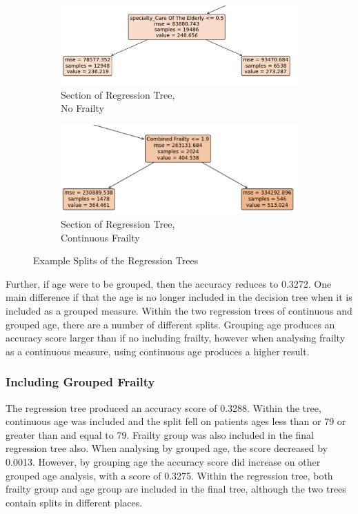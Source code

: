 \documentclass[../thesis.tex]{subfiles}
\begin{document}
\begin{figure}[h!]
\centering
\begin{subfigure}{.49\textwidth}
  \centering
  \captionsetup{justification=centering}
  \includegraphics[width=1\linewidth]{Chapter4/Figures/Split2.png}
  \caption{Section of Regression Tree,\\ No Frailty}
  \label{Fig:RegSplit1}
\end{subfigure}
\begin{subfigure}{.49\textwidth}
  \centering
  \captionsetup{justification=centering}
  \includegraphics[width=1\linewidth]{Chapter4/Figures/Split2a.png}
  \caption{Section of Regression Tree,\\ Continuous Frailty}
  \label{Fig:RegSplit2}
\end{subfigure}
\caption{Example Splits of the Regression Trees}
\label{Fig:Regsplit}
\end{figure}

Further, if age were to be grouped, then the accuracy reduces to 0.3272. One main difference if that the age is no longer included in the decision tree when it is included as a grouped measure. Within the two regression trees of continuous and grouped age, there are a number of different splits. Grouping age produces an accuracy score larger than if no including frailty, however when analysing frailty as a continuous measure, using continuous age produces a higher result.



\subsubsection{Including Grouped Frailty}\label{Sec:Regression3}
The regression tree produced an accuracy score of 0.3288. Within the tree, continuous age was included and the split fell on patients ages less than or 79 or greater than and equal to 79. Frailty group was also included in the final regression tree also. When analysing by grouped age, the score decreased by 0.0013. However, by grouping age the accuracy score did increase on other grouped age analysis, with a score of 0.3275. Within the regression tree, both frailty group and age group are included in the final tree, although the two trees contain splits in different places.
\end{document}
